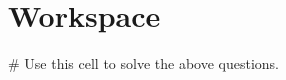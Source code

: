 \documentclass{ximera}
\begin{document}
\begin{question}

\end{question}

\section{Workspace}

\begin{sageCell}
# Use this cell to solve the above questions.
\end{sageCell}
\end{document}
